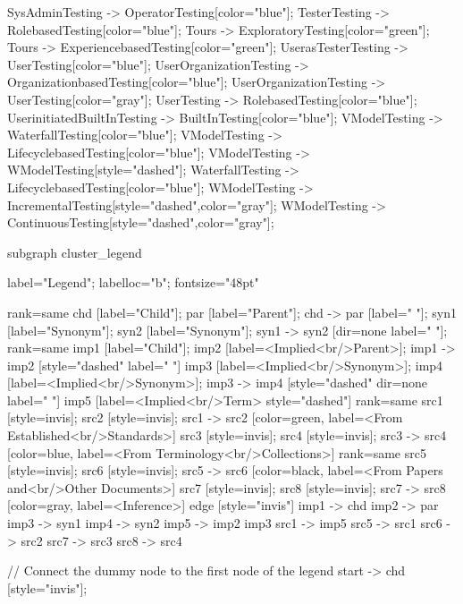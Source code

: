 \documentclass{article}
\begin{document}
{SysAdminTesting -> OperatorTesting[color="blue"];
TesterTesting -> RolebasedTesting[color="blue"];
Tours -> ExploratoryTesting[color="green"];
Tours -> ExperiencebasedTesting[color="green"];
UserasTesterTesting -> UserTesting[color="blue"];
UserOrganizationTesting -> OrganizationbasedTesting[color="blue"];
UserOrganizationTesting -> UserTesting[color="gray"];
UserTesting -> RolebasedTesting[color="blue"];
UserinitiatedBuiltInTesting -> BuiltInTesting[color="blue"];
VModelTesting -> WaterfallTesting[color="blue"];
VModelTesting -> LifecyclebasedTesting[color="blue"];
VModelTesting -> WModelTesting[style="dashed"];
WaterfallTesting -> LifecyclebasedTesting[color="blue"];
WModelTesting -> IncrementalTesting[style="dashed",color="gray"];
WModelTesting -> ContinuousTesting[style="dashed",color="gray"];

subgraph cluster_legend {

    label="Legend";
    labelloc="b";
    fontsize="48pt"

    {
        rank=same
        chd [label="Child"];
        par [label="Parent"];
        chd -> par [label="                "];
        syn1 [label="Synonym"];
        syn2 [label="Synonym"];
        syn1 -> syn2 [dir=none label="                "];
    }
    {
        rank=same
        imp1 [label="Child"];
        imp2 [label=<Implied<br/>Parent>];
        imp1 -> imp2 [style="dashed" label="                "]
        imp3 [label=<Implied<br/>Synonym>];
        imp4 [label=<Implied<br/>Synonym>];
        imp3 -> imp4 [style="dashed" dir=none label="                "]
    }
        imp5 [label=<Implied<br/>Term> style="dashed"]
{
rank=same
src1 [style=invis];
src2 [style=invis];
src1 -> src2 [color=green, label=<From Established<br/>Standards>]
src3 [style=invis];
src4 [style=invis];
src3 -> src4 [color=blue, label=<From Terminology<br/>Collections>]
}
{
rank=same
src5 [style=invis];
src6 [style=invis];
src5 -> src6 [color=black, label=<From Papers and<br/>Other Documents>]
src7 [style=invis];
src8 [style=invis];
src7 -> src8 [color=gray, label=<Inference>]
}
edge [style="invis"]
imp1 -> chd
imp2 -> par
imp3 -> syn1
imp4 -> syn2
imp5 -> { imp2 imp3 }
src1 -> imp5
src5 -> src1
src6 -> src2
src7 -> src3
src8 -> src4
}

// Connect the dummy node to the first node of the legend
start -> chd [style="invis"];
}
\end{document}
